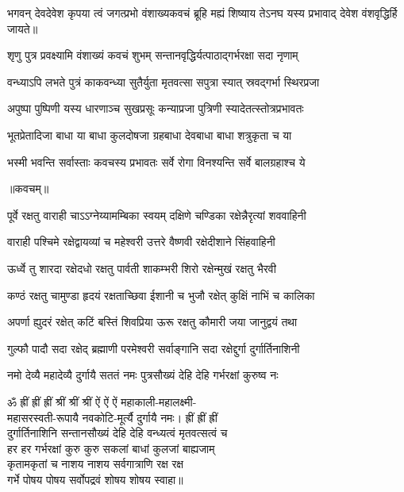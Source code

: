 

\twolineshloka
{भगवन् देवदेवेश कृपया त्वं जगत्प्रभो}
{वंशाख्यकवचं ब्रूहि मह्यं शिष्याय तेऽनघ}%
{यस्य प्रभावाद् देवेश वंशवृद्धिर्हि जायते॥}


\twolineshloka
{शृणु पुत्र प्रवक्ष्यामि वंशाख्यं कवचं शुभम्}
{सन्तानवृद्धिर्यत्पाठाद्गर्भरक्षा सदा नृणाम्}%

\twolineshloka
{वन्ध्याऽपि लभते पुत्रं काकवन्ध्या सुतैर्युता}
{मृतवत्सा सपुत्रा स्यात् स्रवद्गर्भा स्थिरप्रजा}%

\twolineshloka
{अपुष्पा पुष्पिणी यस्य धारणाञ्च सुखप्रसूः}
{कन्याप्रजा पुत्रिणी स्यादेतत्स्तोत्रप्रभावतः}%


\twolineshloka
{भूतप्रेतादिजा बाधा या बाधा कुलदोषजा}
{ग्रहबाधा देवबाधा बाधा शत्रुकृता च या}%

\twolineshloka
{भस्मी भवन्ति सर्वास्ताः कवचस्य प्रभावतः}
{सर्वे रोगा विनश्यन्ति सर्वे बालग्रहाश्च ये}%

\centerline{॥कवचम्॥}

\twolineshloka
{पूर्वे रक्षतु वाराही चाऽऽग्नेय्यामम्बिका स्वयम्}
{दक्षिणे चण्डिका रक्षेन्नैरृत्यां शववाहिनी}%

\twolineshloka
{वाराही पश्चिमे रक्षेद्वायव्यां च महेश्वरी}
{उत्तरे वैष्णवी रक्षेदीशाने सिंहवाहिनी}%

\twolineshloka
{ऊर्ध्वे तु शारदा रक्षेदधो रक्षतु पार्वती}
{शाकम्भरी शिरो रक्षेन्मुखं रक्षतु भैरवी}%

\twolineshloka
{कण्ठं रक्षतु चामुण्डा हृदयं रक्षताच्छिवा}
{ईशानी च भुजौ रक्षेत् कुक्षिं नाभिं च कालिका}%

\twolineshloka
{अपर्णा ह्युदरं रक्षेत् कटिं बस्तिं शिवप्रिया}
{ऊरू रक्षतु कौमारी जया जानुद्वयं तथा}%

\twolineshloka
{गुल्फौ पादौ सदा रक्षेद् ब्रह्माणी परमेश्वरी}
{सर्वाङ्गानि सदा रक्षेद्दुर्गा दुर्गार्तिनाशिनी}%

\twolineshloka
{नमो देव्यै महादेव्यै दुर्गायै सततं नमः}
{पुत्रसौख्यं देहि देहि गर्भरक्षां कुरुष्व नः}%

ॐ ह्रीं ह्रीं ह्रीं श्रीं श्रीं श्रीं ऐं ऐं ऐं महाकाली-महालक्ष्मी-\\
महासरस्वती-रूपायै नवकोटि-मूर्त्यै दुर्गायै नमः। ह्रीं ह्रीं ह्रीं\\
दुर्गार्तिनाशिनि सन्तानसौख्यं देहि देहि वन्ध्यत्वं मृतवत्सत्वं च\\
हर हर गर्भरक्षां कुरु कुरु सकलां बाधां कुलजां बाह्यजाम्\\
कृतामकृतां च नाशय नाशय सर्वगात्राणि रक्ष रक्ष \\
गर्भे पोषय पोषय सर्वोपद्रवं शोषय शोषय स्वाहा॥

